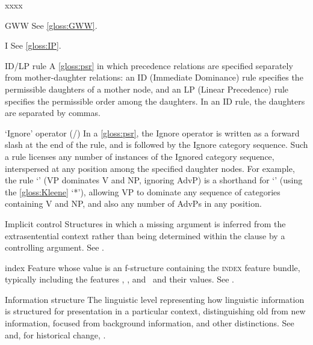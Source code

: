 \documentclass[output=paper,colorlinks,citecolor=brown]{langscibook}
\begin{document}
\begin{labeling}{xxxx}
\item[GWW] See \ref{gloss:GWW}.

\item[I] See \ref{gloss:IP}.

\item[ID/LP rule\namedlabel{gloss:IDLP}{ID/LP rule}] A \ref{gloss:psr} in which precedence relations are specified separately from mother-daughter relations: an ID (Immediate Dominance) rule specifies the permissible daughters of a mother node, and an LP (Linear Precedence) rule specifies the permissible order among the daughters.  In an ID rule, the daughters are separated by commas.

\item[`Ignore' operator (/)\namedlabel{gloss:Ignore}{`Ignore' operator}] In a \ref{gloss:psr}, the Ignore operator is written as a forward slash at the end of the rule, and is followed by the Ignore category sequence.  Such a rule licenses any number of instances of the Ignored category sequence, interspersed at any position among the specified daughter nodes.  For example, the rule `' (VP dominates V and NP, ignoring AdvP) is a shorthand for `' (using the \ref{gloss:Kleene} `*'), allowing VP to dominate any sequence of categories containing V and NP, and also any number of AdvPs in any position.

\item[Implicit control\namedlabel{gloss:implicit}{implicit}] Structures in which a missing argument is inferred from the extrasentential context rather than being determined within the clause by a controlling argument. See .
  
\item[index] Feature whose value is an f-structure containing the \textsc{index} feature bundle, typically including the features \PERS, \NUM, and \GEND\ and their values.  See \citetv[\ref{sec:indexconcord}]{chapters/Agreement}.

\item[Information structure\namedlabel{gloss:istr}{information structure}] The linguistic level representing how linguistic information is structured for presentation in a particular context, distinguishing old from new information, focused from background information, and other distinctions.  See  and, for historical change, \citetv[\ref{sec:Historical:positional}]{chapters/Historical}.


\end{labeling}
\end{document}
